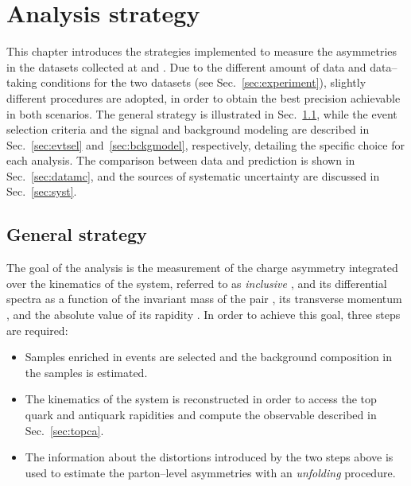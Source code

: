 \chapter{Analysis strategy}
\label{sec:strategy}

This chapter introduces the strategies implemented to measure the
asymmetries in the datasets collected at \seventev{} and \eighttev{}.
Due to the different amount of data and data--taking conditions for
the two datasets (see Sec.~\ref{sec:experiment}), slightly different
procedures are adopted, in order to obtain the best precision
achievable in both scenarios. The general strategy is illustrated in
Sec.~\ref{sec:genstrategy}, while the event
selection criteria and the signal and background modeling are
described in Sec.~\ref{sec:evtsel} and~\ref{sec:bckgmodel},
respectively, detailing the specific choice for each analysis. The
comparison between data and prediction is shown in
Sec.~\ref{sec:datamc}, and the sources of systematic uncertainty are
discussed in Sec.~\ref{sec:syst}.

\section{General strategy}
\label{sec:genstrategy}

The goal of the analysis is the measurement of the charge asymmetry
\ac{} integrated over the kinematics of the \ttbar{} system,
referred to as {\it inclusive \ac{}}, and its differential spectra as
a function of the invariant mass of the \ttbar{} pair \mtt{}, its
transverse momentum \pttt{}, and the absolute value of its rapidity
\ytt{}. In order to achieve this goal, three steps are required:
\begin{itemize}
\item Samples enriched in \ttbar{} events are selected and the
  background composition in the samples is estimated.
\item The kinematics of the \ttbar{} system is reconstructed in order
  to access the top quark and antiquark rapidities and compute the
  \dy{} observable described in Sec.~\ref{sec:topca}.
\item The information about the distortions introduced by the two
  steps above is used to estimate the parton--level asymmetries with
  an {\it unfolding} procedure.
\end{itemize}

